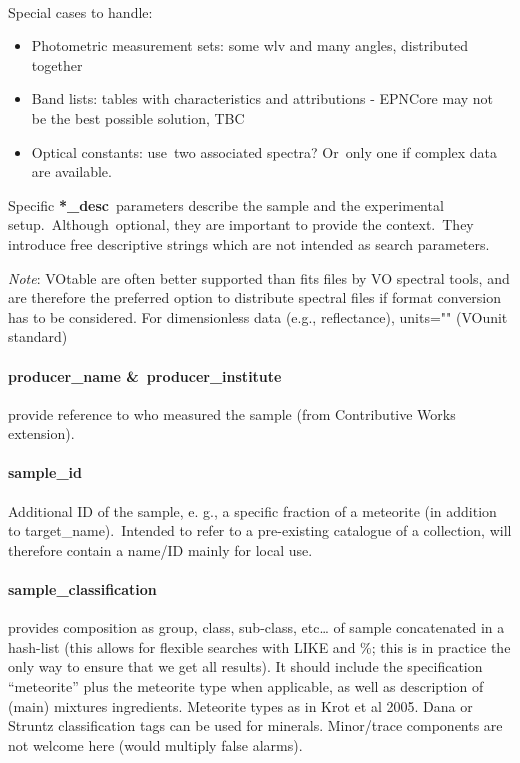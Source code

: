 \documentclass[11pt,a4paper]{ivoa}
\begin{document}
\\

Special cases to handle:

\begin{itemize}
\item Photometric measurement sets: some wlv and many angles, distributed together
\item Band lists: tables with characteristics and attributions - EPNCore may not be the best possible solution, TBC
\item Optical constants: use two associated spectra? Or only one if complex data are available.
\end{itemize}

Specific \textbf{*\_desc} parameters describe the sample and the experimental setup. Although optional, they are important to provide the context. They introduce free descriptive strings which are not intended as search parameters.

\emph{Note}: VOtable are often better supported than fits files by VO spectral tools, and are therefore the preferred option to distribute spectral files if format conversion has to be considered. For dimensionless data (e.g., reflectance), units="" (VOunit standard)

\paragraph{producer\_name \& producer\_institute}

provide reference to who measured the sample (from Contributive Works extension).

\paragraph{sample\_id}

Additional ID of the sample, e. g., a specific fraction of a meteorite (in addition to target\_name). Intended to refer to a pre-existing catalogue of a collection, will therefore contain a name/ID mainly for local use. 

\paragraph{sample\_classification}

provides composition as group, class, sub-class, etc… of sample concatenated in a hash-list (this allows for flexible searches with LIKE and \%; this is in practice the only way to ensure that we get all results). It should include the specification ``meteorite'' plus the meteorite type when applicable, as well as description of (main) mixtures ingredients. Meteorite types as in Krot et al 2005. Dana or Struntz classification tags can be used for minerals. Minor/trace components are not welcome here (would multiply false alarms).
\end{document}
